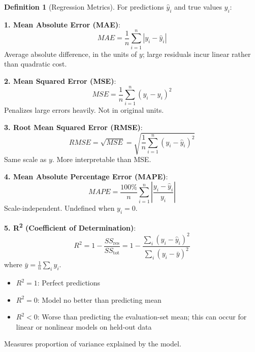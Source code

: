 \documentclass[11pt,twoside]{article}
\numberwithin{equation}{section}
\theoremstyle{plain}
\theoremstyle{definition}
\newtheorem{definition}[theorem]{Definition}
\theoremstyle{remark}
\begin{document}
\begin{definition}[Regression Metrics]
For predictions $\hat{y}_i$ and true values $y_i$:

\textbf{1. Mean Absolute Error (MAE)}:
\[
MAE = \frac{1}{n}\sum_{i=1}^n |y_i - \hat{y}_i|
\]
Average absolute difference, in the units of $y$; large residuals incur linear rather than quadratic cost.

\textbf{2. Mean Squared Error (MSE)}:
\[
MSE = \frac{1}{n}\sum_{i=1}^n (y_i - \hat{y}_i)^2
\]
Penalizes large errors heavily. Not in original units.

\textbf{3. Root Mean Squared Error (RMSE)}:
\[
RMSE = \sqrt{MSE} = \sqrt{\frac{1}{n}\sum_{i=1}^n (y_i - \hat{y}_i)^2}
\]
Same scale as $y$. More interpretable than MSE.

\textbf{4. Mean Absolute Percentage Error (MAPE)}:
\[
MAPE = \frac{100\%}{n}\sum_{i=1}^n \left|\frac{y_i - \hat{y}_i}{y_i}\right|
\]
Scale-independent. Undefined when $y_i = 0$.

\textbf{5. R\textsuperscript{2} (Coefficient of Determination)}:
\[
R^2 = 1 - \frac{SS_{\text{res}}}{SS_{\text{tot}}} = 1 - \frac{\sum_i(y_i - \hat{y}_i)^2}{\sum_i(y_i - \bar{y})^2}
\]
where $\bar{y} = \frac{1}{n}\sum_i y_i$.

\begin{itemize}
\item $R^2 = 1$: Perfect predictions
\item $R^2 = 0$: Model no better than predicting mean
\item $R^2<0$: Worse than predicting the evaluation-set mean; this can occur for linear or nonlinear models on held-out data
\end{itemize}

Measures proportion of variance explained by the model.
\end{definition}
\end{document}
